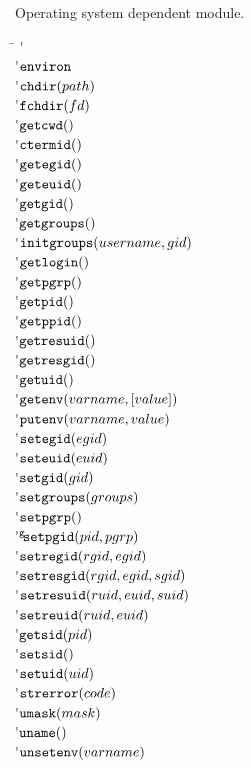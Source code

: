 
Operating system dependent module.

\begin{tabbing}
\hspace{2em}\= \kill
\' \\
\'$\mathop{\mathtt{environ}}$ \`  \\
\'$\mathop{\mathtt{chdir}}(path)$ \`  \\
\'$\mathop{\mathtt{fchdir}}(fd)$ \`  \\
\'$\mathop{\mathtt{getcwd}}()$ \`  \\
\'$\mathop{\mathtt{ctermid}}()$ \`  \\
\'$\mathop{\mathtt{getegid}}()$ \`  \\
\'$\mathop{\mathtt{geteuid}}()$ \`  \\
\'$\mathop{\mathtt{getgid}}()$ \`  \\
\'$\mathop{\mathtt{getgroups}}()$ \`  \\
\'$\mathop{\mathtt{initgroups}}(username, gid)$ \`  \\
\'$\mathop{\mathtt{getlogin}}()$ \`  \\
\'$\mathop{\mathtt{getpgrp}}()$ \`  \\
\'$\mathop{\mathtt{getpid}}()$ \`  \\
\'$\mathop{\mathtt{getppid}}()$ \`  \\
\'$\mathop{\mathtt{getresuid}}()$ \`  \\
\'$\mathop{\mathtt{getresgid}}()$ \`  \\
\'$\mathop{\mathtt{getuid}}()$ \`  \\
\'$\mathop{\mathtt{getenv}}(varname, {[}{value}{]})$ \`  \\
\'$\mathop{\mathtt{putenv}}(varname, value)$ \`  \\
\'$\mathop{\mathtt{setegid}}(egid)$ \`  \\
\'$\mathop{\mathtt{seteuid}}(euid)$ \`  \\
\'$\mathop{\mathtt{setgid}}(gid)$ \`  \\
\'$\mathop{\mathtt{setgroups}}(groups)$ \`  \\
\'$\mathop{\mathtt{setpgrp}}()$ \`  \\
\'$\mathop{\mathtt{^g\!setpgid}}(pid, pgrp)$ \`  \\
\'$\mathop{\mathtt{setregid}}(rgid, egid)$ \`  \\
\'$\mathop{\mathtt{setresgid}}(rgid, egid, sgid)$ \`  \\
\'$\mathop{\mathtt{setresuid}}(ruid, euid, suid)$ \`  \\
\'$\mathop{\mathtt{setreuid}}(ruid, euid)$ \`  \\
\'$\mathop{\mathtt{getsid}}(pid)$ \`  \\
\'$\mathop{\mathtt{setsid}}()$ \`  \\
\'$\mathop{\mathtt{setuid}}(uid)$ \`  \\
\'$\mathop{\mathtt{strerror}}(code)$ \`  \\
\'$\mathop{\mathtt{umask}}(mask)$ \`  \\
\'$\mathop{\mathtt{uname}}()$ \`  \\
\'$\mathop{\mathtt{unsetenv}}(varname)$ \`  \\
\end{tabbing}